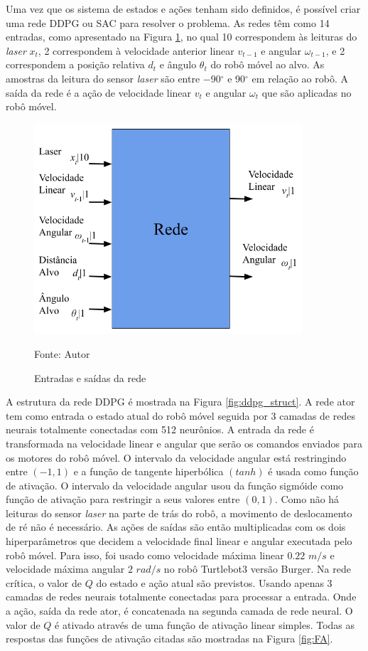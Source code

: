 Uma vez que os sistema de estados e ações tenham sido definidos, é possível criar uma rede DDPG ou SAC para resolver o problema.
As redes têm como 14 entradas, como apresentado na Figura \ref{fig:in_out}, no qual 10 correspondem às leituras do \textit{laser} $x_t$, 2 correspondem à velocidade anterior linear $v_{t-1}$ e angular $\omega_{t-1}$, e 2 correspondem a posição relativa $d_t$ e ângulo $\theta_t$ do robô móvel ao alvo.
As amostras da leitura do sensor \textit{laser} são entre $-$90$^\circ$ e 90$^\circ$ em relação ao robô. A saída da rede é a ação de velocidade linear $v_t$ e angular $\omega_t$ que são aplicadas no robô móvel.

\vspace{0.25cm}
\begin{figure}[H]
\caption{Entradas e saídas da rede}
\centerline{\includegraphics[width=10cm]{imagens/input_and_output.png}}
\small{Fonte: Autor}
\label{fig:in_out}
\end{figure}

A estrutura da rede DDPG é mostrada na Figura \ref{fig:ddpg_struct}. A rede ator tem como entrada o estado atual do robô móvel seguida por 3 camadas de redes neurais totalmente conectadas com 512 neurônios. A entrada da rede é transformada na velocidade linear e angular que serão os comandos enviados para os motores do robô móvel.
O intervalo da velocidade angular está restringindo entre $(-1,1)$ e a função de tangente hiperbólica $(tanh)$ é usada como função de ativação.
O intervalo da velocidade angular usou da função sigmóide como função de ativação para restringir a seus valores entre $(0,1)$.
Como não há leituras do sensor \textit{laser} na parte de trás do robô, a movimento de deslocamento de ré não é necessário.
As ações de saídas são então multiplicadas com os dois
hiperparâmetros que decidem a velocidade final linear e angular executada pelo robô móvel.
Para isso, foi usado como velocidade máxima linear $0.22$ $m/s$ e velocidade máxima angular $2$ $rad/s$ no robô Turtlebot3 versão Burger.
Na rede crítica, o valor de $Q$ do estado e ação atual são previstos.
Usando apenas 3 camadas de redes neurais totalmente conectadas para processar a entrada. Onde a ação, saída da rede ator, é concatenada na segunda camada de rede neural.
O valor de $Q$ é ativado através de uma função de ativação linear simples. Todas as respostas das funções de ativação citadas são mostradas na Figura \ref{fig:FA}.

